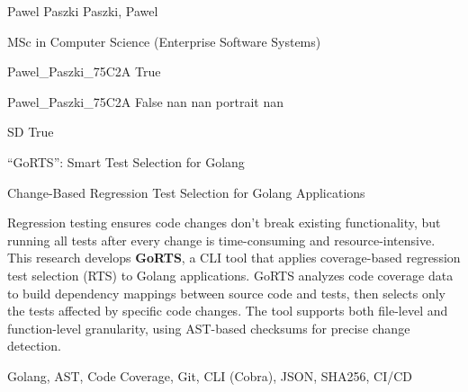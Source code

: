 
\begingroup{}\relax



\def\Key{Pawel_Paszki_75C2A}

{Pawel Paszki}
{Paszki, Pawel}

{MSc in Computer Science (Enterprise Software Systems)}

{Pawel_Paszki_75C2A}
{True}

{Pawel_Paszki_75C2A}
{False}
{nan}
{nan}
{portrait}
{nan}

{SD}
{True}

{\textquotedblleft{}GoRTS\textquotedblright{}: Smart Test Selection for Golang}

{Change-Based Regression Test Selection for Golang Applications}

{Regression testing ensures code changes don't break existing functionality, but running all tests after every change is time-consuming and resource-intensive. This research develops {\bfseries GoRTS}, a CLI tool that applies coverage-based regression test selection (RTS) to Golang applications. GoRTS analyzes code coverage data to build dependency mappings between source code and tests, then selects only the tests affected by specific code changes. The tool supports both file-level and function-level granularity, using AST-based checksums for precise change detection.}

{Golang, AST, Code Coverage, Git, CLI (Cobra), JSON, SHA256, CI/CD}

